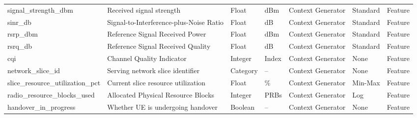 \documentclass[12pt,a4paper]{article}
\begin{document}
\begin{longtable}{p{3cm}p{5cm}p{2cm}p{1.5cm}p{2.3cm}p{2cm}p{2cm}}
	signal\_strength\_dbm &
	Received signal strength &
	Float &
	dBm &
	Context Generator &
	Standard &
	Feature \\
	
	sinr\_db &
	Signal-to-Interference-plus-Noise Ratio &
	Float &
	dB &
	Context Generator &
	Standard &
	Feature \\
	
	rsrp\_dbm &
	Reference Signal Received Power &
	Float &
	dBm &
	Context Generator &
	Standard &
	Feature \\
	
	rsrq\_db &
	Reference Signal Received Quality &
	Float &
	dB &
	Context Generator &
	Standard &
	Feature \\
	
	cqi &
	Channel Quality Indicator &
	Integer &
	Index &
	Context Generator &
	None &
	Feature \\
	
	network\_slice\_id &
	Serving network slice identifier &
	Category &
	-- &
	Context Generator &
	None &
	Feature \\
	
	slice\_resource\_utilization\_pct &
	Current slice resource utilization &
	Float &
	\% &
	Context Generator &
	Min-Max &
	Feature \\
	
	radio\_resource\_blocks\_used &
	Allocated Physical Resource Blocks &
	Integer &
	PRBs &
	Context Generator &
	Log &
	Feature \\
	
	handover\_in\_progress &
	Whether UE is undergoing handover &
	Boolean &
	-- &
	Context Generator &
	None &
	Feature \\
	
	\bottomrule
\end{longtable}
\end{document}

